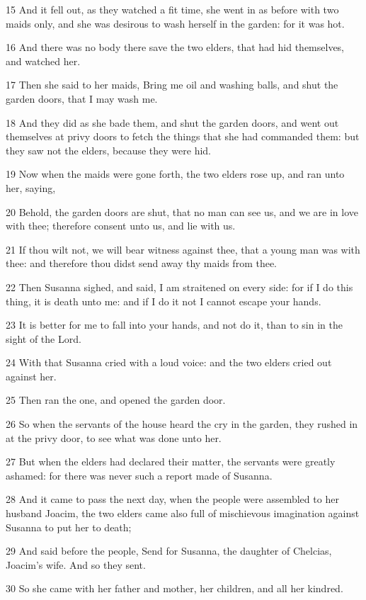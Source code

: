 \par 15 And it fell out, as they watched a fit time, she went in as before with two maids only, and she was desirous to wash herself in the garden: for it was hot.
\par 16 And there was no body there save the two elders, that had hid themselves, and watched her.
\par 17 Then she said to her maids, Bring me oil and washing balls, and shut the garden doors, that I may wash me.
\par 18 And they did as she bade them, and shut the garden doors, and went out themselves at privy doors to fetch the things that she had commanded them: but they saw not the elders, because they were hid.
\par 19 Now when the maids were gone forth, the two elders rose up, and ran unto her, saying,
\par 20 Behold, the garden doors are shut, that no man can see us, and we are in love with thee; therefore consent unto us, and lie with us.
\par 21 If thou wilt not, we will bear witness against thee, that a young man was with thee: and therefore thou didst send away thy maids from thee.
\par 22 Then Susanna sighed, and said, I am straitened on every side: for if I do this thing, it is death unto me: and if I do it not I cannot escape your hands.
\par 23 It is better for me to fall into your hands, and not do it, than to sin in the sight of the Lord.
\par 24 With that Susanna cried with a loud voice: and the two elders cried out against her.
\par 25 Then ran the one, and opened the garden door.
\par 26 So when the servants of the house heard the cry in the garden, they rushed in at the privy door, to see what was done unto her.
\par 27 But when the elders had declared their matter, the servants were greatly ashamed: for there was never such a report made of Susanna.
\par 28 And it came to pass the next day, when the people were assembled to her husband Joacim, the two elders came also full of mischievous imagination against Susanna to put her to death;
\par 29 And said before the people, Send for Susanna, the daughter of Chelcias, Joacim's wife. And so they sent.
\par 30 So she came with her father and mother, her children, and all her kindred.

